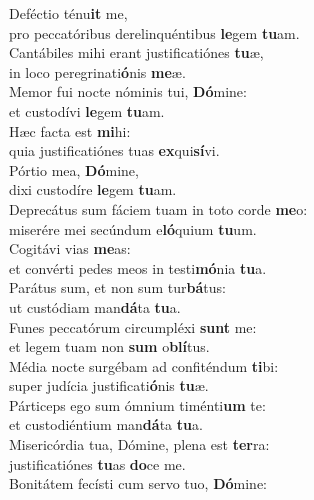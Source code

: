 \oddverse Deféctio ténu\textbf{it} me,~\*\\
\oddverse pro peccatóribus derelinquéntibus \textbf{le}gem \textbf{tu}am.\\
\evenverse Cantábiles mihi erant justificatiónes \textbf{tu}æ,~\*\\
\evenverse in loco peregrinati\textbf{ó}nis \textbf{me}æ.\\
\oddverse Memor fui nocte nóminis tui, \textbf{Dó}mine:~\*\\
\oddverse et custodívi \textbf{le}gem \textbf{tu}am.\\
\evenverse Hæc facta est \textbf{mi}hi:~\*\\
\evenverse quia justificatiónes tuas \textbf{ex}qui\textbf{sí}vi.\\
\oddverse Pórtio mea, \textbf{Dó}mine,~\*\\
\oddverse dixi custodíre \textbf{le}gem \textbf{tu}am.\\
\evenverse Deprecátus sum fáciem tuam in toto corde \textbf{me}o:~\*\\
\evenverse miserére mei secúndum e\textbf{ló}quium \textbf{tu}um.\\
\oddverse Cogitávi vias \textbf{me}as:~\*\\
\oddverse et convérti pedes meos in testi\textbf{mó}nia \textbf{tu}a.\\
\evenverse Parátus sum, et non sum tur\textbf{bá}tus:~\*\\
\evenverse ut custódiam man\textbf{dá}ta \textbf{tu}a.\\
\oddverse Funes peccatórum circumpléxi \textbf{sunt} me:~\*\\
\oddverse et legem tuam non \textbf{sum} o\textbf{blí}tus.\\
\evenverse Média nocte surgébam ad confiténdum \textbf{ti}bi:~\*\\
\evenverse super judícia justificati\textbf{ó}nis \textbf{tu}æ.\\
\oddverse Párticeps ego sum ómnium timénti\textbf{um} te:~\*\\
\oddverse et custodiéntium man\textbf{dá}ta \textbf{tu}a.\\
\evenverse Misericórdia tua, Dómine, plena est \textbf{ter}ra:~\*\\
\evenverse justificatiónes \textbf{tu}as \textbf{do}ce me.\\
\oddverse Bonitátem fecísti cum servo tuo, \textbf{Dó}mine:~\*\\
